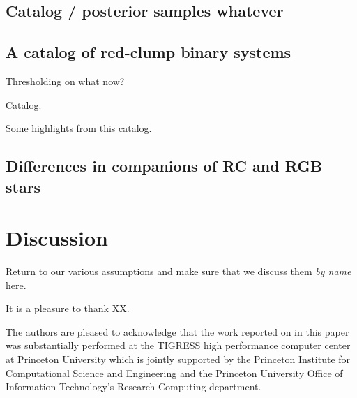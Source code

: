 \documentclass[modern, letterpaper]{aastex61}
\newcommand{\apogee}{\project{\acronym{APOGEE}}}
\newcommand{\sdssiii}{\project{\acronym{SDSS-III}}}
\begin{document}
\subsection{Catalog / posterior samples whatever} \label{sec:full-catalog}


\subsection{A catalog of red-clump binary systems} \label{sec:rc-catalog}


Thresholding on what now?

Catalog.

Some highlights from this catalog.

\subsection{Differences in companions of RC and RGB stars} \label{sec:rc-rgb}


\section{Discussion}

Return to our various assumptions and make sure that we discuss them
\emph{by name} here.

\acknowledgements

It is a pleasure to thank XX.

The authors are pleased to acknowledge that the work reported on in this
paper was substantially performed at the TIGRESS high performance computer
center at Princeton University which is jointly supported by the Princeton
Institute for Computational Science and Engineering and the Princeton
University Office of Information Technology's Research Computing department.


\facility{\sdssiii, \apogee}



\end{document}
